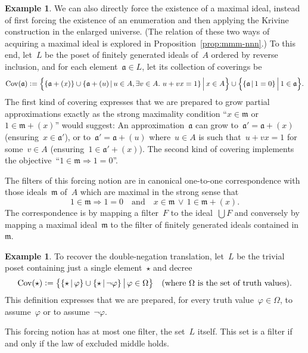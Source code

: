 \documentclass[com,11pt,crcready]{iosart2x}
\theoremstyle{definition}
\newtheorem{example}[definition]{Example}
\theoremstyle{plain}
\theoremstyle{remark}
\newcommand{\?}{\,{:}\,}
\newcommand{\aaa}{\mathfrak{a}}
\newcommand{\mmm}{\mathfrak{m}}
\newcommand{\defeq}{\vcentcolon=}
\newcommand{\Cov}{\mathrm{Cov}}
\renewcommand{\_}{\mathpunct{.}\,}
\begin{document}
\begin{example}\label{ex:notion-max}We can also directly force the existence of a maximal ideal,
instead of first forcing the existence of an enumeration and then applying the
Krivine construction in the enlarged universe. (The relation of these two ways
of acquiring a maximal ideal is explored in
Proposition~\ref{prop:mmm-nnn}.) To this end, let~$L$ be the
poset of finitely generated ideals of~$A$ ordered by reverse inclusion,
and for each element~$\aaa \in L$, let its collection of coverings be
\[\Cov(\aaa) \defeq
  \Bigl\{ \{ \aaa + (x) \} \cup \{ \aaa + (u) \,|\, u \in A, \exists v \in A\_ u + vx = 1 \}
  \,\Big|\, x \in A \Bigr\}
  \cup
  \Bigl\{ \{ \aaa \,|\, 1 = 0 \} \,\Big|\, 1 \in \aaa \Bigr\}.
\]
The first kind of covering expresses that we are prepared to grow partial
approximations exactly as the strong maximality condition ``$x \in \mmm$ or~$1
\in \mmm + (x)$'' would suggest: An approximation~$\aaa$ can grow
to~$\aaa' = \aaa+(x)$ (ensuring~$x \in \aaa'$), or to~$\aaa' = \aaa+(u)$
where~$u \in A$ is such that~$u + vx = 1$ for some~$v \in A$ (ensuring~$1 \in
\aaa' + (x)$). The second kind of covering implements the objective~``$1 \in \mmm
\Rightarrow 1 = 0$''.

The filters of this forcing notion
are in canonical one-to-one correspondence with
those ideals~$\mmm$ of~$A$ which are maximal in the strong sense that
\[
  1 \in \mmm \Longrightarrow 1 = 0
    \quad\text{and}\quad
  x \in \mmm \,\vee\, 1 \in \mmm + (x).
\]
The correspondence is by mapping a filter~$F$ to the ideal~$\bigcup F$
and conversely by mapping a maximal ideal~$\mmm$ to the filter of finitely
generated ideals contained in~$\mmm$.
\end{example}

\begin{example}\label{ex:notion-negneg}To recover the double-negation translation, let~$L$ be the
trivial poset containing just a single element~$\star$ and decree
\[ \Cov(\star) \defeq \bigl\{ \{ \star \,|\, \varphi \} \cup \{ \star \,|\, \neg\varphi \} \,\big|\, \varphi \in \Omega \bigr\}
\quad\text{(where~$\Omega$ is the set of truth values).} \]
This definition expresses that we are prepared, for every truth value~$\varphi
\in \Omega$, to assume~$\varphi$ or to assume~$\neg\varphi$.

This forcing notion has at most one filter, the set~$L$ itself. This set is a
filter if and only if the law of excluded middle holds.
\end{example}
\end{document}
